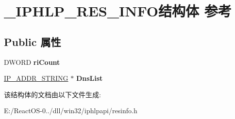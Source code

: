 \hypertarget{struct___i_p_h_l_p___r_e_s___i_n_f_o}{}\section{\+\_\+\+I\+P\+H\+L\+P\+\_\+\+R\+E\+S\+\_\+\+I\+N\+F\+O结构体 参考}
\label{struct___i_p_h_l_p___r_e_s___i_n_f_o}
\subsection*{Public 属性}
\begin{DoxyCompactItemize}
\item 
\mbox{\label{struct___i_p_h_l_p___r_e_s___i_n_f_o_afbcad909d438a0eaf580bc32611b347e}} 
D\+W\+O\+RD {\bfseries ri\+Count}
\item 
\mbox{\label{struct___i_p_h_l_p___r_e_s___i_n_f_o_a90775e721e9d3669be8cbfdf47ce8912}} 
\hyperlink{struct___i_p___a_d_d_r___s_t_r_i_n_g}{I\+P\+\_\+\+A\+D\+D\+R\+\_\+\+S\+T\+R\+I\+NG} $\ast$ {\bfseries Dns\+List}
\end{DoxyCompactItemize}


该结构体的文档由以下文件生成\+:\begin{DoxyCompactItemize}
\item 
E\+:/\+React\+O\+S-\/0../dll/win32/iphlpapi/resinfo.\+h\end{DoxyCompactItemize}
